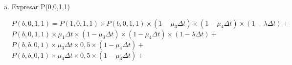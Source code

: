 \documentclass[a4paper,11pt]{article}
\begin{document}
\begin{enumerate}[a)]
  \vspace{13pt}
  \item Expresar P(0,0,1,1)

  \leftskip=6pt
  \parindent=-18pt
  $P(b,0,1,1) = P(1,0,1,1) \times P(b,0,1,1) \times (1-\mu_3\Delta t) \times (1-\mu_4\Delta t) \times (1-\lambda\Delta t) +$
  $ P(b,0,1,1) \times \mu_1\Delta t \times (1-\mu_3\Delta t) \times (1-\mu_4\Delta t) \times (1-\lambda\Delta t) +$
  $ P(b,b,0,1) \times \mu_3\Delta t \times 0,5 \times (1-\mu_4\Delta t) +$
  $ P(b,b,0,1) \times \mu_4\Delta t \times 0,5 \times (1-\mu_3\Delta t) +$

\vspace{13pt}
\end{enumerate}
%
%
%
%
%
%
%
%
\end{document}
